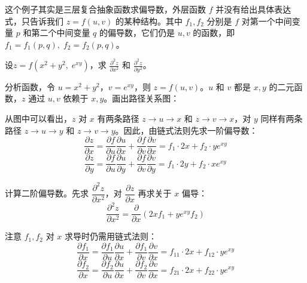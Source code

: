 这个例子其实是三层复合抽象函数求偏导数，外层函数 $f$ 并没有给出具体表达式，只告诉我们 $z = f(u,v)$ 的某种结构。其中 \(f_1, f_2\) 分别是 \(f\) 对第一个中间变量 \(p\) 和第二个中间变量 \(q\) 的偏导数，它们仍是 \(u, v\) 的函数，即 \(f_1 = f_1(p,q),\; f_2 = f_2(p,q)\)。


\begin{myexample}
  设\(z = f(x^2 + y^2,\; e^{xy})\)，求 \(\frac{\partial^2 z}{\partial x^2}\) 和 \(\frac{\partial^2 z}{\partial y^2}\)。

  分析函数，令 \(u = x^2 + y^2\)，\(v = e^{xy}\)，则 \(z = f(u, v)\)。\(u\) 和 \(v\) 都是 \(x, y\) 的二元函数，\(z\) 通过 \(u, v\) 依赖于 \(x, y\)。画出路径关系图：

\begin{center}
\end{center}

从图中可以看出，\(z\) 对 \(x\) 有两条路径 \(z \to u \to x\) 和 \(z \to v \to x\)，对 \(y\) 同样有两条路径 \(z \to u \to y\) 和 \(z \to v \to y\)。因此，由链式法则先求一阶偏导数：
\[
\frac{\partial z}{\partial x} = \frac{\partial f}{\partial u}\frac{\partial u}{\partial x} + \frac{\partial f}{\partial v}\frac{\partial v}{\partial x} = f_1 \cdot 2x + f_2 \cdot y e^{xy}
\]
\[
\frac{\partial z}{\partial y} = \frac{\partial f}{\partial u}\frac{\partial u}{\partial y} + \frac{\partial f}{\partial v}\frac{\partial v}{\partial y} = f_1 \cdot 2y + f_2 \cdot x e^{xy}
\]

计算二阶偏导数。先求 \(\dfrac{\partial^2 z}{\partial x^2}\)，对 \(\dfrac{\partial z}{\partial x}\) 再求关于 \(x\) 偏导：
\[
\frac{\partial^2 z}{\partial x^2} = \frac{\partial}{\partial x}(2x f_1 + y e^{xy} f_2)
\]

注意 \(f_1, f_2\) 对 \(x\) 求导时仍需用链式法则：
\[
\frac{\partial f_1}{\partial x} = \frac{\partial f_1}{\partial u}\frac{\partial u}{\partial x} + \frac{\partial f_1}{\partial v}\frac{\partial v}{\partial x} = f_{11}\cdot 2x + f_{12}\cdot y e^{xy}
\]
\[
\frac{\partial f_2}{\partial x} = \frac{\partial f_2}{\partial u}\frac{\partial u}{\partial x} + \frac{\partial f_2}{\partial v}\frac{\partial v}{\partial x} = f_{21}\cdot 2x + f_{22}\cdot y e^{xy}
\]


\end{myexample}
